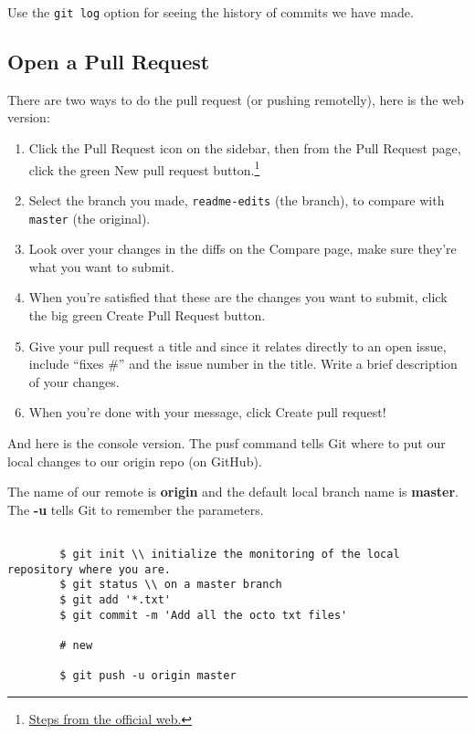 \documentclass[12pt]{article}
\begin{document}
		Use the \verb|git log| option for seeing the history of commits we have made. 







	\subsection{Open a Pull Request}

		There are two ways to do the pull request (or pushing remotelly), here is the web version: 

		\begin{enumerate}
		\item Click the  Pull Request icon on the sidebar, then from the Pull Request page, click the green New pull request button.\footnote{\href{https://guides.github.com/activities/hello-world/}{Steps from the official web.}}
		\item Select the branch you made, \verb|readme-edits| (the branch), to compare with \verb|master| (the original).
		\item Look over your changes in the diffs on the Compare page, make sure they’re what you want to submit.
		\item When you’re satisfied that these are the changes you want to submit, click the big green Create Pull Request button.
		\item Give your pull request a title and since it relates directly to an open issue, include “fixes #” and the issue number in the title. Write a brief description of your changes.
		\item When you’re done with your message, click Create pull request!
		\end{enumerate}

		And here is the console version. The pusf command tells Git where to put our local changes to our origin repo (on GitHub).

		The name of our remote is \textbf{origin} and the default local branch name is \textbf{master}. The \textbf{-u} tells Git to remember the parameters.

		\begin{verbatim}

		$ git init \\ initialize the monitoring of the local repository where you are.
		$ git status \\ on a master branch
		$ git add '*.txt'
		$ git commit -m 'Add all the octo txt files'
		
		# new

		$ git push -u origin master

		\end{verbatim}
\end{document}
